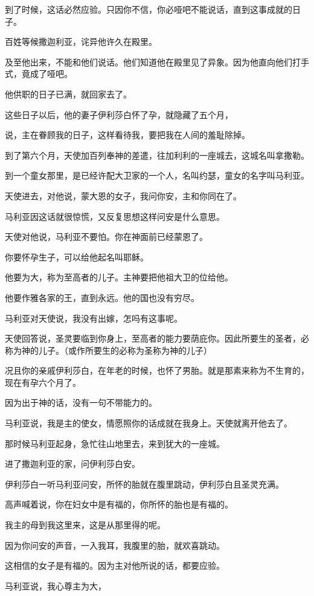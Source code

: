 \documentclass[12pt,oneside]{book}
\begin{document}
到了时候，这话必然应验。只因你不信，你必哑吧不能说话，直到这事成就的日子。

百姓等候撒迦利亚，诧异他许久在殿里。

及至他出来，不能和他们说话。他们知道他在殿里见了异象。因为他直向他们打手式，竟成了哑吧。

他供职的日子已满，就回家去了。

这些日子以后，他的妻子伊利莎白怀了孕，就隐藏了五个月，

说，主在眷顾我的日子，这样看待我，要把我在人间的羞耻除掉。

到了第六个月，天使加百列奉神的差遣，往加利利的一座城去，这城名叫拿撒勒。

到一个童女那里，是已经许配大卫家的一个人，名叫约瑟，童女的名字叫马利亚。

天使进去，对他说，蒙大恩的女子，我问你安，主和你同在了。

马利亚因这话就很惊慌，又反复思想这样问安是什么意思。

天使对他说，马利亚不要怕。你在神面前已经蒙恩了。

你要怀孕生子，可以给他起名叫耶稣。

他要为大，称为至高者的儿子。主神要把他祖大卫的位给他。

他要作雅各家的王，直到永远。他的国也没有穷尽。

马利亚对天使说，我没有出嫁，怎吗有这事呢。

天使回答说，圣灵要临到你身上，至高者的能力要荫庇你。因此所要生的圣者，必称为神的儿子。（或作所要生的必称为圣称为神的儿子）

况且你的亲戚伊利莎白，在年老的时候，也怀了男胎。就是那素来称为不生育的，现在有孕六个月了。

因为出于神的话，没有一句不带能力的。

马利亚说，我是主的使女，情愿照你的话成就在我身上。天使就离开他去了。

那时候马利亚起身，急忙往山地里去，来到犹大的一座城。

进了撒迦利亚的家，问伊利莎白安。

伊利莎白一听马利亚问安，所怀的胎就在腹里跳动，伊利莎白且圣灵充满。

高声喊着说，你在妇女中是有福的，你所怀的胎也是有福的。

我主的母到我这里来，这是从那里得的呢。

因为你问安的声音，一入我耳，我腹里的胎，就欢喜跳动。

这相信的女子是有福的。因为主对他所说的话，都要应验。

马利亚说，我心尊主为大，
\end{document}
